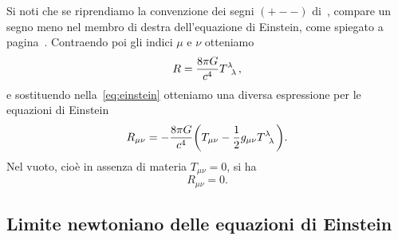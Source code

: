 Si noti che se riprendiamo la convenzione dei segni $(+--)$
di~\textcite{weinberg:gravitation}, compare un segno meno nel membro di destra
dell'equazione di Einstein, come spiegato a
pagina~\pageref{eq:convenzione-segni}.  Contraendo poi gli indici $\mu$ e $\nu$
otteniamo
\begin{equation}
  R = \frac{8\pi G}{c^{4}}\tensor{T}{^{\lambda}_{\lambda}},
\end{equation}
e sostituendo nella~\eqref{eq:einstein} otteniamo una diversa espressione per le
 equazioni di Einstein
\begin{equation}
  R_{\mu\nu} = -\frac{8\pi G}{c^{4}} \bigg( T_{\mu\nu} -
  \frac{1}{2}g_{\mu\nu}\tensor{T}{^{\lambda}_{\lambda}} \bigg).
\end{equation}
Nel vuoto, cioè in assenza di materia $T_{\mu \nu} =0$, si ha
\begin{equation}
  R_{\mu\nu} = 0.
\end{equation}

\subsection{Limite newtoniano delle equazioni di Einstein}
\label{sec:limite-newtoniano-einstein}

